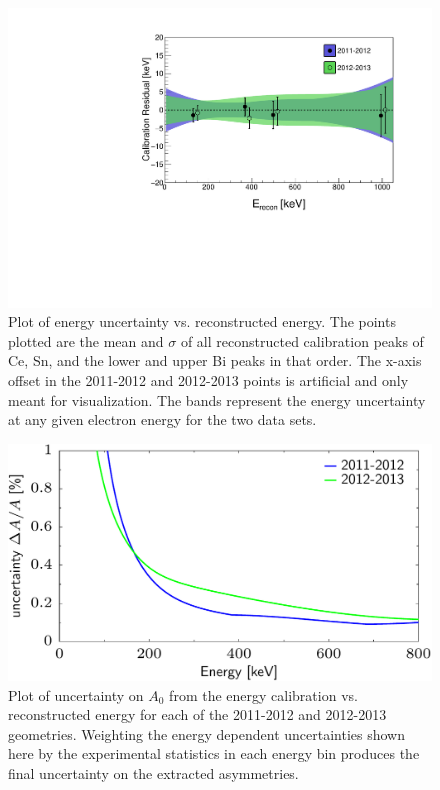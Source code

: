 \begin{figure}[h]
\centering
\includegraphics[scale=.65]{5-UCNAResults/energyErrorEnvelope_color.pdf}
\caption{Plot of energy uncertainty vs. reconstructed energy. The points plotted are the mean
  and $\sigma$ of all reconstructed calibration peaks of Ce, Sn, and the lower and
  upper Bi peaks in that order. The x-axis offset in the 2011-2012 and 2012-2013 points is
  artificial and only meant for visualization. The bands represent the energy uncertainty
  at any given electron energy for the two data sets.}
\label{fig:errEnv}
\end{figure}

\begin{figure}[h]
\centering
\includegraphics[scale=.50]{5-UCNAResults/EnergyUncertALL.pdf}
\caption{Plot of uncertainty on $A_0$ from the energy calibration vs. reconstructed energy
  for each of the 2011-2012 and 2012-2013 geometries. Weighting the energy dependent
  uncertainties shown here by the experimental statistics in each energy bin produces
  the final uncertainty on the extracted asymmetries.}
\label{fig:energyUncert}
\end{figure}

